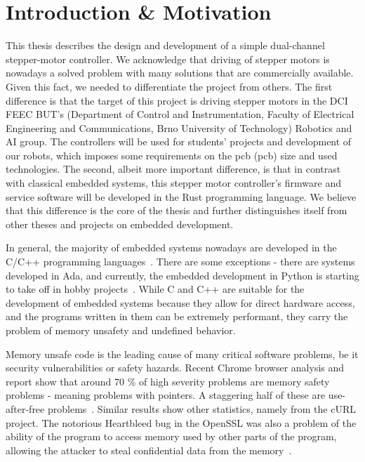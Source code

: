 \chapter*{Introduction \& Motivation}
{}
This thesis describes the design and development of a simple dual-channel stepper-motor controller.
We acknowledge that driving of stepper motors is nowadays a solved problem with many solutions that are commercially available.
Given this fact, we needed to differentiate the project from others.
The first difference is that the target of this project is driving stepper motors in the DCI FEEC BUT's (Department of Control and Instrumentation, Faculty of Electrical Engineering and Communications, Brno University of Technology) Robotics and AI group.
The controllers will be used for students' projects and development of our robots, which imposes some requirements on the \acs{pcb} (\acl{pcb}) size and used technologies.
The second, albeit more important difference, is that in contrast with classical embedded systems, this stepper motor controller's firmware and service software will be developed in the Rust programming language.
We believe that this difference is the core of the thesis and further distinguishes itself from other theses and projects on embedded development.

In general, the majority of embedded systems nowadays are developed in the C/C++ programming languages~\cite{cohen_tech_nodate, dubois_programming_nodate, noauthor_embedded_2021}.
There are some exceptions - there are systems developed in Ada, and currently, the embedded development in Python is starting to take off in hobby projects~\cite{circuitpython_circuitpython_2021}.
While C and C++ are suitable for the development of embedded systems because they allow for direct hardware access, and the programs written in them can be extremely performant, they carry the problem of memory unsafety and undefined behavior.

Memory unsafe code is the leading cause of many critical software problems, be it security vulnerabilities or safety hazards.
Recent Chrome browser analysis and report show that around 70 \% of high severity problems are memory safety problems - meaning problems with pointers.
A staggering half of these are use-after-free problems~\cite{chromium_projects_memory_nodate}.
Similar results show other statistics, namely from the cURL project\cite{stenberg_half_nodate}.
The notorious Heartbleed bug in the OpenSSL was also a problem of the ability of the program to access memory used by other parts of the program, allowing the attacker to steal confidential data from the memory~\cite{synopsys_heartbleed_2020}.

